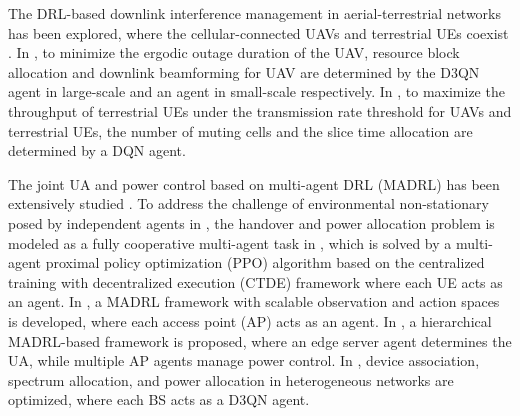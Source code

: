 The DRL-based downlink interference management in aerial-terrestrial networks has been explored, where the cellular-connected UAVs and terrestrial UEs coexist \cite{li2023radio, burhanuddin2023inter}.
In \cite{li2023radio}, to minimize the ergodic outage duration of the UAV, resource block allocation and downlink beamforming for UAV are determined by the D3QN agent in large-scale and an agent in small-scale respectively.
In \cite{burhanuddin2023inter}, to maximize the throughput of terrestrial UEs under the transmission rate threshold for UAVs and terrestrial UEs, the number of muting cells and the slice time allocation are determined by a DQN agent.

The joint UA and power control based on multi-agent DRL (MADRL) has been extensively studied \cite{guo2020joint, naderializadeh2021resource, alwarafy2022hierarchical, yang2022distributed}.
To address the challenge of environmental non-stationary posed by independent agents in \cite{wang2018handover}, the handover and power allocation problem is modeled as a fully cooperative multi-agent task in \cite{guo2020joint}, which is solved by a multi-agent proximal policy optimization (PPO) algorithm based on the centralized training with decentralized execution (CTDE) framework where each UE acts as an agent.
In \cite{naderializadeh2021resource}, a MADRL framework with scalable observation and action spaces is developed, where each access point (AP) acts as an agent.
In \cite{alwarafy2022hierarchical}, a hierarchical MADRL-based framework is proposed, where an edge server agent determines the UA, while multiple AP agents manage power control.
In \cite{yang2022distributed}, device association, spectrum allocation, and power allocation in heterogeneous networks are optimized, where each BS acts as a D3QN agent.


